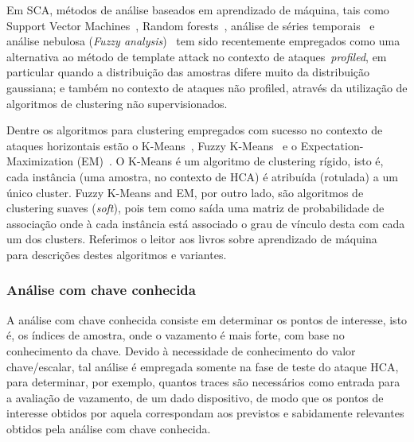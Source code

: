 Em SCA, métodos de análise baseados em aprendizado de máquina, tais como Support Vector Machines~\cite{Bartkewitz2013}, Random forests~\cite{Lerman2014RFandSOM}, análise de séries temporais~\cite{Lerman2013} e análise nebulosa (\textit{Fuzzy analysis})~\cite{SaeediKong2014}  tem sido recentemente empregados como uma alternativa ao método de template attack no contexto de ataques~\textit{profiled}, em particular quando a distribuição das amostras difere muito da distribuição gaussiana; e também no contexto de ataques não profiled, através da utilização de algoritmos de clustering não supervisionados.


Dentre os algoritmos para clustering empregados com sucesso no contexto de ataques horizontais estão o K-Means~\cite{Forgy1965KMeans, Lloyd1982KMeans}, Fuzzy K-Means~\cite{Dunn1973FuzzyKMeans} e o Expectation-Maximization (EM)~\cite{DempsterLairdRubin1977EMAlg}. O K-Means é um algoritmo de clustering rígido, isto é, cada instância (uma amostra, no contexto de HCA) é atribuída (rotulada) a um único cluster. Fuzzy K-Means and EM, por outro lado, são algoritmos de clustering suaves (\textit{soft}), pois tem como saída uma matriz de probabilidade de associação onde à cada instância está associado o grau de vínculo desta com cada um dos clusters. Referimos o leitor aos livros sobre aprendizado de máquina~\cite{Alpaydin2014, WittenFrank2011, Han2011, Bishop2007, DudaHartStork2001} para descrições destes algoritmos e variantes.


\subsubsection{Análise com chave conhecida}

A análise com chave conhecida consiste em determinar os pontos de interesse, isto é, os índices de amostra, onde o vazamento é mais forte, com base no conhecimento da chave. Devido à necessidade de conhecimento do valor chave/escalar, tal análise é empregada somente na fase de teste do ataque HCA, para determinar, por exemplo, quantos traces são necessários como entrada para a avaliação de vazamento, de um dado dispositivo, de modo que os pontos de interesse obtidos por aquela correspondam aos previstos e sabidamente relevantes obtidos pela análise com chave conhecida.

